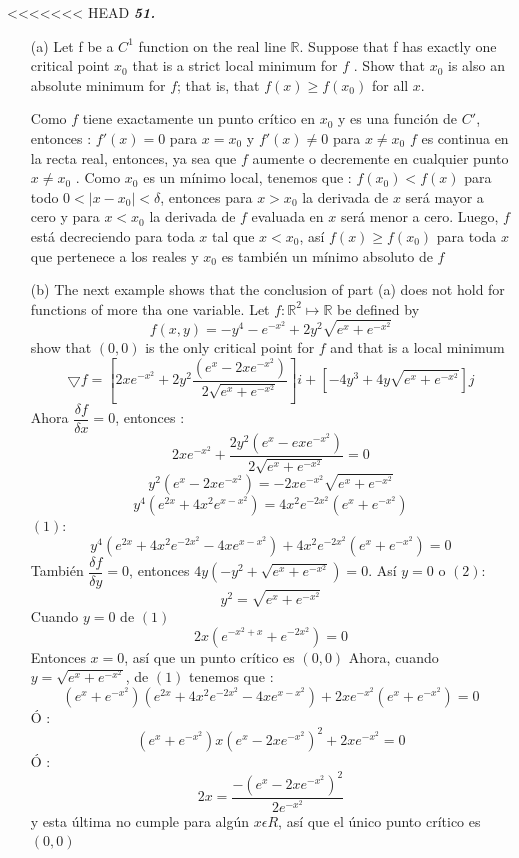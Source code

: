 \documentclass[a4paper,12pt]{article}
\begin{document}
<<<<<<< HEAD
\textit{\textbf{51.}}
	\begin{itemize}
		\item[(a)] Let f be a $C^1$ function on the real line $\mathbb{R}$. Suppose that f has exactly one critical point $x_{0}$ that is a strict local minimum for $f$ . Show that $x_{0}$ is also an absolute minimum for $f$; that is, that $f(x) \geq f(x_{0})$ for all $x$.

		Como $f$ tiene exactamente un punto crítico en $x_{0}$ y es una función de $C'$, entonces :
		$f'(x) = 0$ para $x= x_{0}$ y $f'(x)\neq 0$ para $x\neq x_{0}$
		$f$ es continua en la recta real, entonces, ya sea que $f$ aumente o decremente en cualquier punto $x\neq x_{0}$ . Como $x_{0}$ es un mínimo local, tenemos que :
		$f(x_0)< f(x)$ para todo $0<| x-x_{0}| < \delta$, entonces para $x> x_{0}$ la derivada de $x$ será mayor a cero y para $x<x_{0}$ la derivada de $f$ evaluada en $x$ será menor a cero.
		Luego, $f$ está decreciendo para toda $x$ tal que $x<x_{0}$, así $f(x)\geq f(x_0)$ para toda $x$ que pertenece a los reales y $x_0$ es también un mínimo absoluto de $f$
		\item[(b)] The next example shows that the conclusion of part (a) does not hold for functions of more tha one variable. Let $f: \mathbb{R}^2 \mapsto \mathbb{R}$ be defined by
		\[f(x,y) = -y^4-e^{-x^2}+2y^2 \sqrt{e^x + e^{-x^2}}\]
		show that $(0,0)$ is the only critical point for $f$ and that is a local minimum
		\[\bigtriangledown f = \left[ 2xe^{-x^2}+2y^2 \dfrac{\left( e^x -2xe^{-x^2} \right)}{2\sqrt{e^x+e^{-x^2}}}\right]i +\left[-4y^3+4y \sqrt{e^x+e^{-x^2}} \right]j\]
		Ahora $\dfrac{\delta f}{\delta x} = 0$, entonces :
		\[2xe^{-x^2}+ \dfrac{2y^2 \left(e^x-ex e^{-x^2} \right)}{2\sqrt{e^x + e^{-x^2}}}= 0\]
		\[y^2(e^x-2x e^{-x^2})= -2xe^{-x^2}\sqrt{e^x+ e^{-x^2}}\]
		\[y^4 \left(e^{2x}+4x^2 e^{x-x^2} \right) = 4x^2e^{-2x^2}\left(e^x + e^{-x^2}\right)\]
	$(1):$
		\[y^4\left(e^{2x}+4x^2e^{-2x^2}-4xe^{x-x^2} \right)+ 4x^2e^{-2x^2}\left( e^x+ e^{-x^2}\right)=0 \]
		También $\dfrac{\delta f}{\delta y} = 0$, entonces $4y\left(-y^2+ \sqrt{e^x + e^{-x^2}}\right)=0$. Así $y=0$ o $(2):$
		\[y^2= \sqrt{e^x+ e^{-x^2}}\]
		Cuando $y = 0$ de $(1)$
		\[2x \left(e^{-x^2+x}+ e^{-2x^2} \right)=0\]
		Entonces $x=0$, así que un punto crítico es $(0,0)$
		Ahora, cuando $y = \sqrt{e^x+ e^{-x^2}}$, de $(1)$ tenemos que :
		\[(e^x+ e^{-x^2})(e^{2x}+4x^2e^{-2x^2}-4xe^{x-x^2})+2xe^{-x^2}(e^x+ e^{-x^2})=0\]
		Ó :
		\[(e^x+e^{-x^2})x(e^x-2xe^{-x^2})^2 +2xe^{-x^2}=0\]
		Ó :
		\[2x=\dfrac{-\left( e^x- 2xe^{-x^2}\right)^2}{2e^{-x^2}}\]
		y esta última no cumple para algún $x\epsilon R$, así que el único punto crítico es $(0,0)$

\end{itemize}
\end{document}
